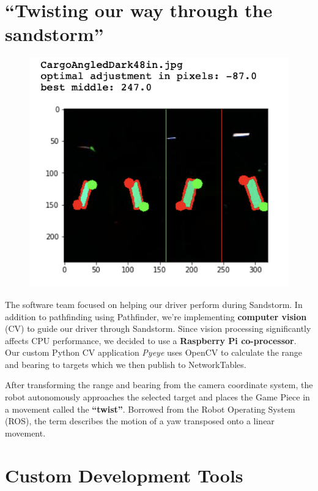 \documentclass[10pt,tumble]{leaflet}
\begin{document}
\section{``Twisting our way through the sandstorm''}

\begin{figure}[H]
	\centering
	\includegraphics[scale=0.75]{assets/vision}
\end{figure}

The software team focused on helping our driver perform during Sandstorm. In addition to pathfinding using Pathfinder, we're implementing \textbf{computer vision} (CV) to guide our driver through Sandstorm. Since vision processing significantly affects CPU performance, we decided to use a \textbf{Raspberry Pi co-processor}. Our custom Python CV application \textit{Pyeye} uses OpenCV to calculate the range and bearing to targets which we then publish to NetworkTables.

After transforming the range and bearing from the camera coordinate system, the robot autonomously approaches the selected target and places the Game Piece in a movement called the \textbf{``twist''}. Borrowed from the Robot Operating System (ROS), the term describes the motion of a yaw transposed onto a linear movement.

\section{Custom Development Tools}
\end{document}
